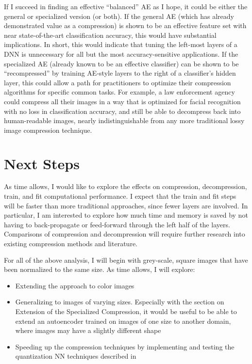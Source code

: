 \documentclass[twoside,11pt]{article}
\begin{document}
If I succeed in finding an effective “balanced” AE as I hope, it could be either the general or specialized version (or both). 
If the general AE (which has already demonstrated value as a compression) is shown to be an effective feature set with near state-of-the-art classification accuracy, this would have substantial implications. 
In short, this would indicate that tuning the left-most layers of a DNN is unnecessary for all but the most accuracy-sensitive applications. If the specialized AE (already known to be an effective classifier) can be shown to be “recompressed” by training AE-style layers to the right of a classifier’s hidden layer, this could allow a path for practitioners to optimize their compression algorithms for specific common tasks. For example, a law enforcement agency could compress all their images in a way that is optimized for facial recognition with no loss in classification accuracy, and still be able to decompress back into human-readable images, nearly indistinguishable from any more traditional lossy image compression technique.








\section{Next Steps}

As time allows, I would like to explore the effects on compression, decompression, train, and fit computational performance. I expect that the train and fit steps will be faster than more traditional approaches, since fewer layers are involved. In particular, I am interested to explore how much time and memory is saved by not having to back-propagate or feed-forward through the left half of the layers. Comparisons of compression and decompression will require further research into existing compression methods and literature.

For all of the above analysis, I will begin with grey-scale, square images that have been normalized to the same size. As time allows, I will explore:
\begin{itemize}
    \item Extending the approach to color images
    \item Generalizing to images of varying sizes. Especially with the section on 
        Extension of the Specialized Compression, it would be useful to be able to 
        extend an autoencoder trained on images of one size to another domain, where 
        images may have a slightly different shape
    \item Speeding up the compression techniques by implementing and testing 
        the quantization NN techniques described in \citet{hubara2018}
\end{itemize}
\end{document}

